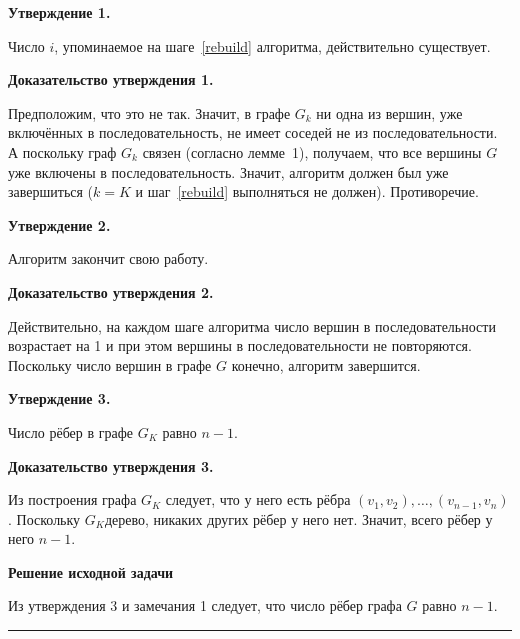 \documentclass[a4paper,12pt]{article}
\begin{document}
{\bf Утверждение 1.}

Число $i$, упоминаемое на шаге~\ref{rebuild} алгоритма, действительно существует.

{\bf Доказательство утверждения 1.}

Предположим, что это не так. Значит, в графе $G_k$ ни одна из вершин, уже включённых в последовательность, не имеет соседей не из последовательности. А поскольку граф $G_k$ связен (согласно лемме~1), получаем, что все вершины $G$ уже включены в последовательность. Значит, алгоритм должен был уже завершиться ($k = K$ и шаг~\ref{rebuild} выполняться не должен). Противоречие.

{\bf Утверждение 2.}

Алгоритм закончит свою работу.

{\bf Доказательство утверждения 2.}

Действительно, на каждом шаге алгоритма число вершин в последовательности возрастает на 1 и при этом вершины в последовательности не повторяются. Поскольку число вершин в графе $G$ конечно, алгоритм завершится.

{\bf Утверждение 3.}

Число рёбер в графе $G_K$ равно $n-1$.

{\bf Доказательство утверждения 3.}

Из построения графа $G_K$ следует, что у него есть рёбра $(v_1, v_2), \ldots, (v_{n-1}, v_n)$. Поскольку $G_K$\т дерево, никаких других рёбер у него нет. Значит, всего рёбер у него $n-1$.

{\bf Решение исходной задачи}

Из утверждения 3 и замечания 1 следует, что число рёбер графа $G$ равно $n-1$.

\medskip
\hrule
\end{document}
